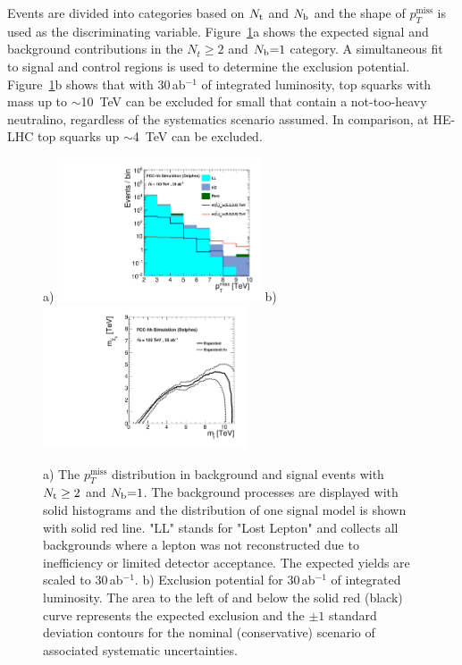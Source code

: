 \documentclass[11pt,twoside,a4paper]{cernrep}
\begin{document}
Events are divided into categories based on $N_{\rm t}$ and $N_{\rm b}$ and the shape of $p_T^{\mathrm{miss}}$ is used as the discriminating variable. Figure~\ref{stops}a shows the expected signal and background contributions in the $N_t \geq 2$ and $N_{\rm b}{=}1$ category. A simultaneous fit to signal and control regions is used to determine the exclusion potential. Figure~\ref{stops}b shows that with 30\,ab$^{-1}$ of integrated luminosity, top squarks with mass up to $\sim$10~TeV can be excluded for small that contain a not-too-heavy neutralino, regardless of the systematics scenario assumed. In comparison, at HE-LHC top squarks up $\sim$4~TeV can be excluded.
%
%
%
\begin{figure}
  \centering
  a)
  \includegraphics[width=6cm]{sr_1.pdf}
  b)
  \includegraphics[width=6cm]{lim_30ab_comb.pdf}
  \caption{a) The $p_T^{\mathrm{miss}}$ distribution in background and signal events with $N_{\rm t} \geq 2$ and $N_{\rm b}{=}1$. The background processes are displayed with solid histograms and the distribution of one signal model is shown with solid red line. "LL" stands for "Lost Lepton" and collects all backgrounds where a lepton was not reconstructed due to inefficiency or limited detector acceptance. The expected yields are scaled to 30\,ab$^{-1}$. b) Exclusion potential for 30\,ab$^{-1}$ of integrated luminosity. The area to the left of and below the solid red (black) curve represents the expected exclusion and the $\pm1$ standard deviation contours for the nominal (conservative) scenario of associated systematic uncertainties.}
  \label{stops}
\end{figure}
\end{document}
